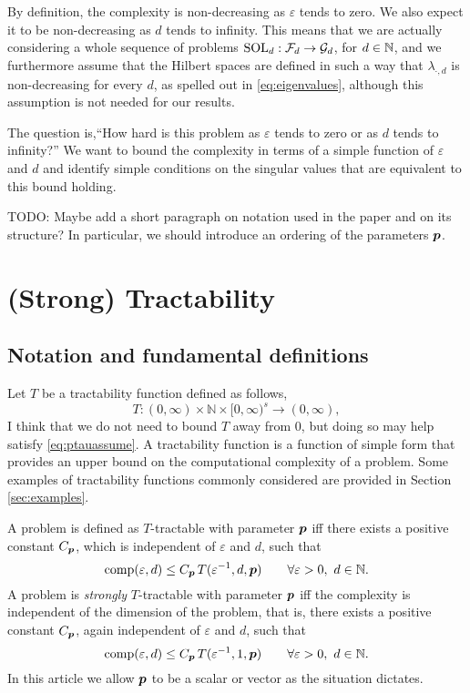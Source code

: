 \documentclass[11pt,a4paper]{article}
\DeclareMathOperator{\SOL}{SOL}
\newcommand{\fred}[1]{\begingroup\color{blue}#1\endgroup}
\newcommand{\peter}[1]{\begingroup\color{purple}#1\endgroup}
\begin{document}
By definition, the complexity is non-decreasing  as $\varepsilon$ tends to zero.  We also expect it to be non-decreasing as $d$ tends to infinity.  \peter{This means that we are actually considering 
a whole sequence of problems  $\SOL_d : \cf_d \to \cg_d$, for $d\in\mathbb{N}$, and we furthermore assume} that the Hilbert spaces are defined in such a way that $\lambda_{\cdot,d}$ is non-decreasing for every $d$, as spelled out in \eqref{eq:eigenvalues}, although this assumption is not needed for our results.

The question is,``How hard is this problem as $\varepsilon$ tends to zero or as $d$ tends to infinity?''  We want to bound the complexity in terms of a simple function of $\varepsilon$ and $d$ and identify simple conditions on the singular values that are equivalent to this bound holding.

\peter{TODO: Maybe add a short paragraph on notation used in the paper and on its structure? In particular, we should introduce 
an ordering of the parameters $\boldsymbol{p}$.}

\section{(Strong) Tractability}

\subsection{Notation and fundamental definitions}
Let $T$ be a tractability function defined as follows,
\begin{equation} \label{eq:Tspec}
    T :(0,\infty) \times \mathbb{N} \times [0,\infty)^s \rightarrow (0,\infty),
\end{equation}
\fred{I think that we do not need to bound $T$ away from $0$, but doing so may help satisfy \eqref{eq:ptauassume}.}
A tractability function is a function of simple form that provides an upper bound on the computational complexity of a problem.  Some examples of tractability functions commonly considered are provided in Section \ref{sec:examples}.


A problem is defined as $T$-tractable with parameter $\boldsymbol{p}$ iff there exists a positive constant $C_{\boldsymbol{p}}$, \peter{which is independent of $\varepsilon$ and $d$,} such that
\begin{equation} \label{eq:tract_def}
	\operatorname{comp}(\varepsilon,d) \le C_{\boldsymbol{p}}\, T(\varepsilon^{-1},d,\boldsymbol{p}) \qquad \forall \varepsilon >0, \ d \in \mathbb{N}.
\end{equation}
A problem is \emph{strongly}
$T$-tractable with parameter $\boldsymbol{p}$ iff the complexity is independent of the dimension of the problem, that is, there exists a positive constant $C_{\boldsymbol{p}}$, \peter{again independent of $\varepsilon$ and $d$,} such that
\begin{equation} \label{eq:strong_tract_def}
	\operatorname{comp}(\varepsilon,d) \le C_{\boldsymbol{p}}\, T(\varepsilon^{-1},1,\boldsymbol{p}) \qquad \forall \varepsilon >0 , \ d \in \mathbb{N}.
\end{equation}
In this article we allow $\boldsymbol{p}$ to be a scalar or vector as the situation dictates.
\end{document}
